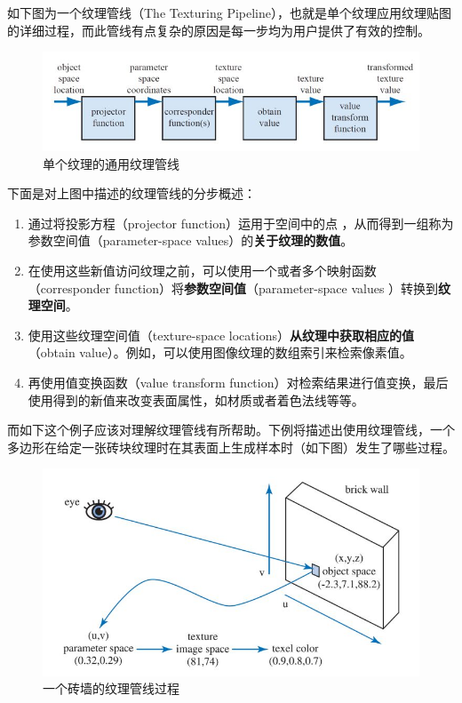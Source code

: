 \documentclass[UTF8,a4paper,12pt]{ctexbook}
\begin{document}
		如下图为一个纹理管线（The Texturing Pipeline），也就是单个纹理应用纹理贴图的详细过程，而此管线有点复杂的原因是每一步均为用户提供了有效的控制。
			\begin{figure}[H]
				\centering
				\includegraphics[scale=0.67]{TexturePipeline}
				\caption{单个纹理的通用纹理管线}
			\end{figure}
			
		下面是对上图中描述的纹理管线的分步概述：
			\begin{enumerate}[itemindent = 2em]
				\item 通过将投影方程（projector function）运用于空间中的点 ，从而得到一组称为参数空间值（parameter-space values）的\textbf{关于纹理的数值}。
				\item 在使用这些新值访问纹理之前，可以使用一个或者多个映射函数（corresponder function）将\textbf{参数空间值}（parameter-space values ）转换到\textbf{纹理空间}。
				\item 使用这些纹理空间值（texture-space locations）\textbf{从纹理中获取相应的值}（obtain value）。例如，可以使用图像纹理的数组索引来检索像素值。
				\item 再使用值变换函数（value transform function）对检索结果进行值变换，最后使用得到的新值来改变表面属性，如材质或者着色法线等等。
			\end{enumerate}

		而如下这个例子应该对理解纹理管线有所帮助。下例将描述出使用纹理管线，一个多边形在给定一张砖块纹理时在其表面上生成样本时（如下图）发生了哪些过程。
			\begin{figure}[H]
				\centering
				\includegraphics[scale=0.67]{TexturePipeline2}
				\caption{一个砖墙的纹理管线过程}
			\end{figure}
		
\end{document}
